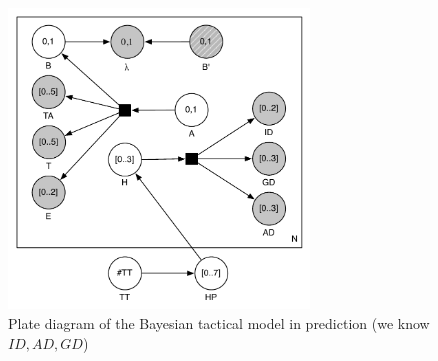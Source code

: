 \begin{figure}[h]
\begin{center}
\includegraphics[width=8cm]{images/SpecialTactics_plate.pdf}
\caption{Plate diagram of the Bayesian tactical model in prediction (we know $ID, AD, GD$)}
\label{fig:SpecialTactics_plate}
\end{center}
\end{figure}

